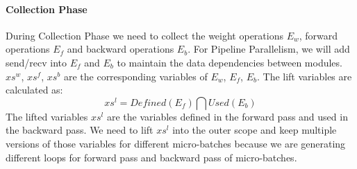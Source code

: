 \documentclass[sigplan, nonacm]{acmart}\settopmatter{printfolios=true,printccs=false,printacmref=false}
\begin{document}
\paragraph{Collection Phase}
During Collection Phase we need to collect the weight operations $E_w$, forward operations $E_f$ and backward operations $E_b$. For Pipeline Parallelism, we will add send/recv into $E_f$ and $E_b$ to maintain the data dependencies between modules. $xs^w$, $xs^f$, $xs^b$ are the corresponding variables of $E_w$, $E_f$, $E_b$. The lift variables are calculated as: $$xs^l = Defined(E_f) \bigcap Used(E_b)$$The lifted variables $xs^l$ are the variables defined in the forward pass and used in the backward pass. We need to lift $xs^l$ into the outer scope and keep multiple versions of those variables for different micro-batches because we are generating different loops for forward pass and backward pass of micro-batches.\par
\end{document}
